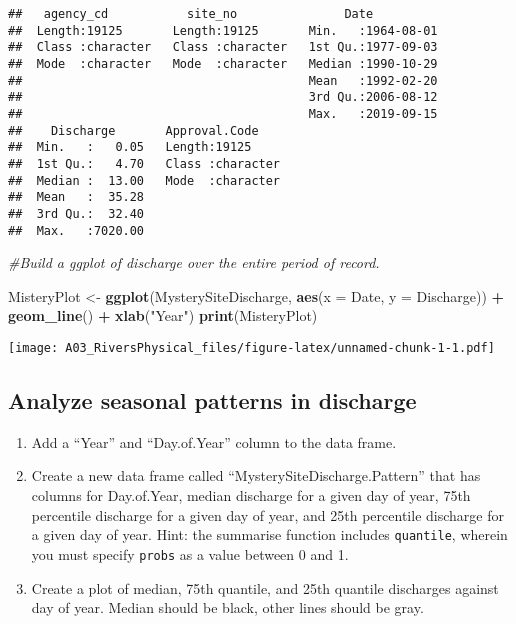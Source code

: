 \documentclass[]{article}
\newenvironment{Shaded}{\begin{snugshade}}{\end{snugshade}}
\newcommand{\CommentTok}[1]{\textcolor[rgb]{0.56,0.35,0.01}{\textit{#1}}}
\newcommand{\DataTypeTok}[1]{\textcolor[rgb]{0.13,0.29,0.53}{#1}}
\newcommand{\KeywordTok}[1]{\textcolor[rgb]{0.13,0.29,0.53}{\textbf{#1}}}
\newcommand{\NormalTok}[1]{#1}
\newcommand{\OperatorTok}[1]{\textcolor[rgb]{0.81,0.36,0.00}{\textbf{#1}}}
\newcommand{\StringTok}[1]{\textcolor[rgb]{0.31,0.60,0.02}{#1}}
\providecommand{\tightlist}{%
  \setlength{\itemsep}{0pt}\setlength{\parskip}{0pt}}
\begin{document}
\begin{verbatim}
##   agency_cd           site_no               Date           
##  Length:19125       Length:19125       Min.   :1964-08-01  
##  Class :character   Class :character   1st Qu.:1977-09-03  
##  Mode  :character   Mode  :character   Median :1990-10-29  
##                                        Mean   :1992-02-20  
##                                        3rd Qu.:2006-08-12  
##                                        Max.   :2019-09-15  
##    Discharge       Approval.Code     
##  Min.   :   0.05   Length:19125      
##  1st Qu.:   4.70   Class :character  
##  Median :  13.00   Mode  :character  
##  Mean   :  35.28                     
##  3rd Qu.:  32.40                     
##  Max.   :7020.00
\end{verbatim}

\begin{Shaded}
\begin{Highlighting}[]
\CommentTok{#Build a ggplot of discharge over the entire period of record.}

\NormalTok{MisteryPlot <-}\StringTok{ }
\StringTok{  }\KeywordTok{ggplot}\NormalTok{(MysterySiteDischarge, }\KeywordTok{aes}\NormalTok{(}\DataTypeTok{x =}\NormalTok{ Date, }\DataTypeTok{y =}\NormalTok{ Discharge)) }\OperatorTok{+}
\StringTok{         }\KeywordTok{geom_line}\NormalTok{() }\OperatorTok{+}
\StringTok{         }\KeywordTok{xlab}\NormalTok{(}\StringTok{"Year"}\NormalTok{)}
\KeywordTok{print}\NormalTok{(MisteryPlot)}
\end{Highlighting}
\end{Shaded}

\texttt{[image: A03\_RiversPhysical\_files/figure-latex/unnamed-chunk-1-1.pdf]}

\hypertarget{analyze-seasonal-patterns-in-discharge}{%
\subsection{Analyze seasonal patterns in
discharge}\label{analyze-seasonal-patterns-in-discharge}}

\begin{enumerate}
\def\labelenumi{\arabic{enumi}.}
\setcounter{enumi}{4}
\tightlist
\item
  Add a ``Year'' and ``Day.of.Year'' column to the data frame.
\item
  Create a new data frame called ``MysterySiteDischarge.Pattern'' that
  has columns for Day.of.Year, median discharge for a given day of year,
  75th percentile discharge for a given day of year, and 25th percentile
  discharge for a given day of year. Hint: the summarise function
  includes \texttt{quantile}, wherein you must specify \texttt{probs} as
  a value between 0 and 1.
\item
  Create a plot of median, 75th quantile, and 25th quantile discharges
  against day of year. Median should be black, other lines should be
  gray.
\end{enumerate}
\end{document}
